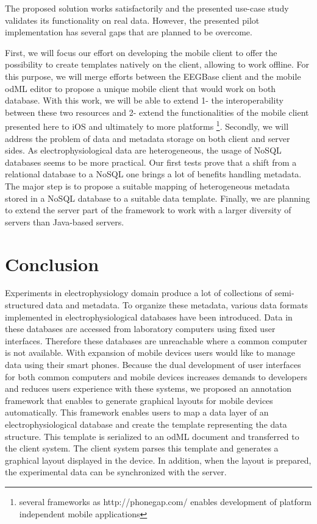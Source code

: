 \documentclass[conference]{IEEEtran}
\begin{document}
The proposed solution works satisfactorily and the presented use-case study validates its functionality on real data. However, the presented pilot implementation has several gaps that are planned to be overcome.

First, we will focus our effort on developing the mobile client to offer the possibility to create templates natively on the client, allowing to work offline. For this purpose, we will merge efforts between the EEGBase client and the mobile odML editor \cite{10.3389/conf.fninf.2014.18.00053} to propose a unique mobile client that would work on both database. With this work, we will be able to extend 1- the interoperability between these two resources and 2- extend the functionalities of the mobile client presented here to iOS and ultimately to more platforms \footnote{several frameworks as http://phonegap.com/ enables development of platform independent mobile applications}.
Secondly, we will address the problem of data and metadata storage on both client and server sides. As electrophysiological data are heterogeneous, the usage of NoSQL databases seems to be more practical. Our first tests prove \cite{Jezek2014422} that a shift from a relational database to a NoSQL one brings a lot of benefits handling metadata. The major step is to propose a suitable mapping of heterogeneous metadata stored in a NoSQL database to a suitable data template. Finally, we are planning to extend the server part of the framework to work with a larger diversity of servers than Java-based servers.



\section{Conclusion}




Experiments in electrophysiology domain produce a lot of collections of semi-structured data and metadata. To organize these metadata, various data formats implemented in electrophysiological databases have been introduced. Data in these databases are accessed from laboratory computers using fixed user interfaces. Therefore these databases are unreachable where a common computer is not available. With expansion of mobile devices users would like to manage data using their smart phones. Because the dual development of user interfaces for both common computers and mobile devices increases demands to developers and reduces users experience with these systems, we proposed an annotation framework that enables to generate graphical layouts for mobile devices automatically. This framework enables users to map a data layer of an electrophysiological database and create the template representing the data structure. This template is serialized to an odML document and transferred to the client system. The client system parses this template and generates a graphical layout displayed in the device. In addition, when the layout is prepared, the experimental data can be synchronized with the server.
\end{document}
